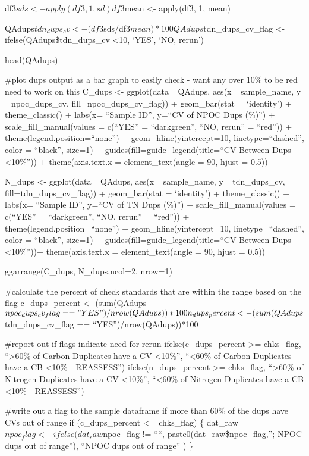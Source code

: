 \documentclass[
]{article}
\begin{document}
df3\(sds <- apply(df3,1,sd) df3\)mean \textless- apply(df3, 1, mean)

QAdups\(tdn_dups_cv <- (df3\)sds/df3\(mean) * 100 QAdups\)tdn\_dups\_cv\_flag
\textless- ifelse(QAdups\$tdn\_dups\_cv \textless10, `YES', `NO, rerun')

head(QAdups)

\#plot dups output as a bar graph to easily check - want any over 10\%
to be red need to work on this C\_dups \textless- ggplot(data =QAdups,
aes(x =sample\_name, y =npoc\_dups\_cv, fill=npoc\_dups\_cv\_flag)) +
geom\_bar(stat = `identity') + theme\_classic() + labs(x= ``Sample ID'',
y=``CV of NPOC Dups (\%)'') + scale\_fill\_manual(values = c(``YES'' =
``darkgreen'', ``NO, rerun'' = ``red'')) +
theme(legend.position=``none'') + geom\_hline(yintercept=10,
linetype=``dashed'', color = ``black'', size=1) +
guides(fill=guide\_legend(title=``CV Between Dups \textless10\%'')) +
theme(axis.text.x = element\_text(angle = 90, hjust = 0.5))

N\_dups \textless- ggplot(data =QAdups, aes(x =sample\_name, y
=tdn\_dups\_cv, fill=tdn\_dups\_cv\_flag)) + geom\_bar(stat =
`identity') + theme\_classic() + labs(x= ``Sample ID'', y=``CV of TN
Dups (\%)'') + scale\_fill\_manual(values = c(``YES'' = ``darkgreen'',
``NO, rerun'' = ``red'')) + theme(legend.position=``none'') +
geom\_hline(yintercept=10, linetype=``dashed'', color = ``black'',
size=1) + guides(fill=guide\_legend(title=``CV Between Dups
\textless10\%''))+ theme(axis.text.x = element\_text(angle = 90, hjust =
0.5))

ggarrange(C\_dups, N\_dups,ncol=2, nrow=1)

\#calculate the percent of check standards that are within the range
based on the flag c\_dups\_percent \textless-
(sum(QAdups\(npoc_dups_cv_flag == "YES")/nrow(QAdups))*100 n_dups_percent <- (sum(QAdups\)tdn\_dups\_cv\_flag
== ``YES'')/nrow(QAdups))*100

\#report out if flags indicate need for rerun ifelse(c\_dups\_percent
\textgreater= chks\_flag, ``\textgreater60\% of Carbon Duplicates have a
CV \textless10\%'', ``\textless60\% of Carbon Duplicates have a CB
\textless10\% - REASSESS'') ifelse(n\_dups\_percent \textgreater=
chks\_flag, ``\textgreater60\% of Nitrogen Duplicates have a CV
\textless10\%'', ``\textless60\% of Nitrogen Duplicates have a CB
\textless10\% - REASSESS'')

\#write out a flag to the sample dataframe if more than 60\% of the dups
have CVs out of range if (c\_dups\_percent \textless= chks\_flag) \{
dat\_raw\(npoc_flag <- ifelse(  dat_raw\)npoc\_flag != ````,
paste0(dat\_raw\$npoc\_flag,''; NPOC dups out of range''), ``NPOC dups
out of range'' ) \}
\end{document}
